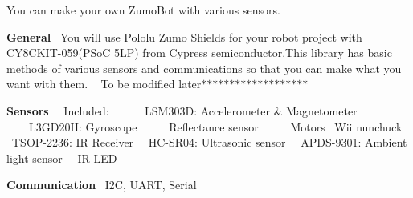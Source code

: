 You can make your own Zumo\+Bot with various sensors. ~\newline
 

{\bfseries General}~\newline
 You will use Pololu Zumo Shields for your robot project with C\+Y8\+C\+K\+I\+T-\/059(P\+SoC 5\+LP) from Cypress semiconductor.\+This library has basic methods of various sensors and communications so that you can make what you want with them. ~\newline
 To be modified later$\ast$$\ast$$\ast$$\ast$$\ast$$\ast$$\ast$$\ast$$\ast$$\ast$$\ast$$\ast$$\ast$$\ast$$\ast$$\ast$$\ast$$\ast$$\ast$ ~\newline
~\newline
~\newline
 

{\bfseries Sensors}~\newline
 ~Included\+: ~\newline
 ~~~~L\+S\+M303D\+: Accelerometer \& Magnetometer~\newline
 ~~~~L3\+G\+D20H\+: Gyroscope~\newline
 ~~~~Reflectance sensor~\newline
 ~~~~Motors ~Wii nunchuck~\newline
 ~T\+S\+O\+P-\/2236\+: IR Receiver~\newline
 ~H\+C-\/\+S\+R04\+: Ultrasonic sensor~\newline
 ~A\+P\+D\+S-\/9301\+: Ambient light sensor~\newline
 ~IR L\+ED ~\newline
~\newline
~\newline
 

{\bfseries Communication}~\newline
 I2C, U\+A\+RT, Serial~\newline
 